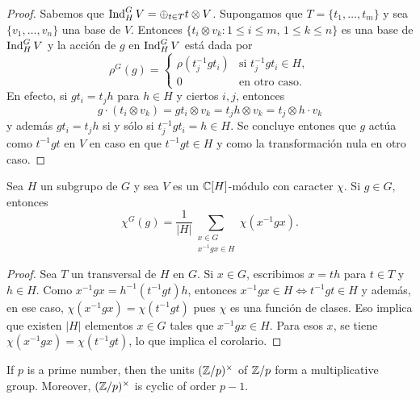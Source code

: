\begin{proof}
    Sabemos que $\operatorname{Ind}_H^GV=\oplus_{t\in T}t\otimes V$. 
    Supongamos que $T=\{t_1,\dots,t_m\}$ 
    y sea $\{v_1,\dots,v_n\}$ una base de $V$. 
    Entonces $\{t_i\otimes v_k:1\leq i\leq m,\,1\leq k\leq n\}$ es 
    una base de $\operatorname{Ind}_H^GV$ y la acción
    de $g$ en $\operatorname{Ind}_H^GV$ está dada por
    \[
    \rho^G(g)=\begin{cases}
    \rho(t_j^{-1}gt_i) & \text{si $t_j^{-1}gt_i\in H$},\\
    0 & \text{en otro caso}.
    \end{cases}
    \]
    En efecto, si $gt_i=t_jh$ para $h\in H$ y ciertos $i,j$, entonces 
    \[
    g\cdot (t_i\otimes v_k)=gt_i\otimes v_k=t_jh\otimes v_k=t_j\otimes h\cdot v_k
    \]
    y además $gt_i=t_jh$ si y sólo si $t_j^{-1}gt_i=h\in H$. Se concluye entones
    que $g$ actúa como $t^{-1}gt$ en $V$ en caso en que $t^{-1}gt\in H$ y 
    como la transformación nula en otro caso. 
\end{proof}

\begin{corollary}
\label{cor:induccion}
    Sea $H$ un subgrupo de $G$ 
    y sea $V$ es un $\mathbb{C}[H]$-módulo con caracter $\chi$.
    Si $g\in G$, entonces
    \[
    \chi^G(g)=\frac{1}{|H|}\sum_{\substack{x\in G\\x^{-1}gx\in H}}\chi(x^{-1}gx).
    \]
\end{corollary}

\begin{proof}
    Sea $T$ un transversal de $H$ en $G$. Si $x\in G$, escribimos $x=th$ para $t\in T$ y $h\in H$. 
    Como $x^{-1}gx=h^{-1}(t^{-1}gt)h$, entonces $x^{-1}gx\in H\Longleftrightarrow t^{-1}gt\in H$ y además, en ese caso, 
    $\chi(x^{-1}gx)=\chi(t^{-1}gt)$ pues $\chi$ es una función de clases. Eso implica que existen $|H|$ elementos $x\in G$ 
    tales que $x^{-1}gx\in H$. Para esos $x$, se tiene $\chi(x^{-1}gx)=\chi(t^{-1}gt)$, lo que implica 
    el corolario. 
\end{proof}


\label{Frobenius}

If $p$ is a prime number, then
the units $(\mathbb{Z}/p)^{\times}$ 
of $\mathbb{Z}/p$ form a multiplicative group. Moreover, 
$(\mathbb{Z}/p)^{\times}$ 
is cyclic of order $p-1$. 

